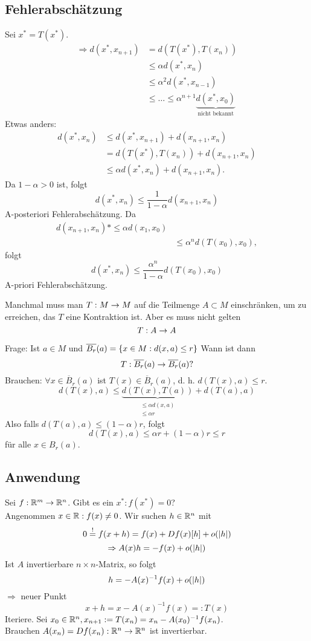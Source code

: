 \documentclass[../ana2.tex]{subfiles}
\begin{document}
\subsection*{Fehlerabschätzung}
Sei \( x^* = T(x^*) \). 
\begin{align*}
    \Rightarrow d(x^*, x_{n+1}) &= d(T(x^*), T(x_n)) \\
    &\leq \alpha d(x^*, x_n) \\
    &\leq \alpha^2 d(x^*, x_{n-1}) \\
    &\leq \ldots \leq \alpha^{n+1} \underbrace{d(x^*, x_0)}_{\text{nicht bekannt}}
\end{align*}
Etwas anders: 
\begin{align*}
    d(x^*, x_n) &\leq d(x^*, x_{n+1}) + d(x_{n+1}, x_n) \\
    &= d(T(x^*), T(x_n)) + d(x_{n+1}, x_n)\\
    &\leq \alpha d(x^*, x_n) + d(x_{n+1}, x_n).
\end{align*}
Da \(1- \alpha > 0\) ist, folgt
\[ d(x^*, x_n) \leq \frac{1}{1-\alpha} d(x_{n+1}, x_n) \]
A-posteriori Fehlerabschätzung.
Da
\begin{align*}
    d(x_{n+1}, x_n) *\leq \alpha d(x_1, x_0) \\
    &\leq \alpha^n d(T(x_0), x_0),
\end{align*}
folgt 
\[ d(x^*, x_n) \leq \frac{\alpha^n}{1-\alpha} d(T(x_0),x_0) \]
A-priori Fehlerabschätzung.
\begin{bem}
    Manchmal muss man \(T:M\rightarrow M\) auf die Teilmenge \(A \subset M\)
    einschränken, um zu erreichen, das \(T\) eine Kontraktion ist. 
    Aber es muss nicht gelten 
    \[ T:A\rightarrow A \]    
\end{bem}
Frage: Ist \(a \in M\) und \(\overline{B_r}(a) = \{x \in M: d(x,a) \leq r\}\)
Wann ist dann 
\[ T:\overline{B_r}(a)\rightarrow \overline{B_r}(a) \text{?}\]
Brauchen: \(\forall x \in \overline{B}_r(a) \) ist \(T(x) \in \overline{B}_r(a)\),
d. h. \(d(T(x), a) \leq r\).
\[ d(T(x), a) \leq \underbrace{d(T(x), T(a))}_{
    \substack{\leq \alpha d(x, a) \\ \leq \alpha r}} + d(T(a), a) \]
Also falls \( d(T(a), a) \leq (1 - \alpha)r \), folgt 
\[ d(T(x), a) \leq \alpha r + (1-\alpha) r \leq r \]
für alle \( x\in B_r(a) \).
\subsection*{Anwendung}
Sei \( f:\mathbb{R}^m\rightarrow \mathbb{R}^n \). Gibt es ein \( x^*: f(x^*) = 0 \)?\\
Angenommen \( x \in \mathbb{R}: f(x) \neq 0 \). Wir suchen \( h\in\mathbb{R}^n \) 
mit 
\[ 0 \overset{!}{=} f(x+h) = f(x) + Df(x)[h] + o(\left|h\right|) \]
\[ \Rightarrow A(x)h = -f(x)  + o(\left|h\right|)\]
Ist \(A\) invertierbare \(n \times n\)-Matrix, so folgt
\[ h = -A(x)^{-1} f(x) + o(\left|h\right|) \]
\( \Rightarrow \) neuer Punkt 
\[ x + h = x - A(x)^{-1} f(x) =: T(x) \]
Iteriere. Sei \( x_0 \in \mathbb{R}^n, x_{n+1} := T(x_n) = x_n - A(x_0)^{-1} f(x_n) \).\\
Brauchen \( A(x_n) = Df(x_n):\mathbb{R}^n\rightarrow \mathbb{R}^n \) ist invertierbar.
\end{document}
